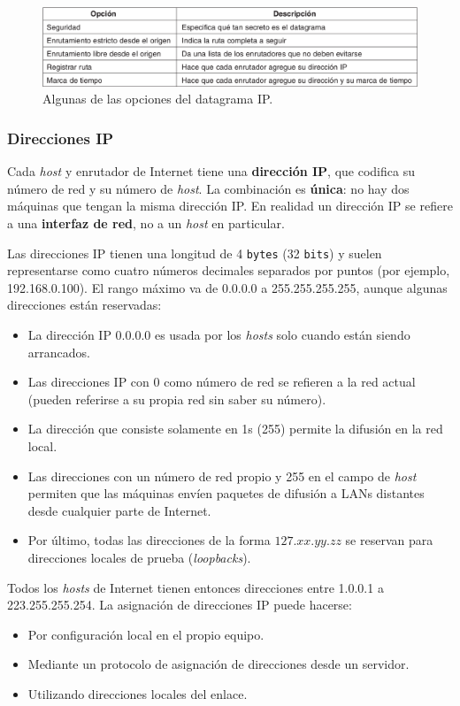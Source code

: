 \documentclass[10pt,a4paper]{article}
\begin{document}
\begin{figure}[ht!]
  \caption{Algunas de las opciones del datagrama IP.}
  \label{fig:opciones_IP}
  \centerline{\includegraphics[width=\textwidth-\fboxrule-\fboxrule]{imgs/opciones_IP.png}}
\end{figure}

\subsubsection{Direcciones IP}

Cada \textit{host} y enrutador de Internet tiene una \textbf{dirección IP}, que codifica su número de red y su número de \textit{host}. La combinación es \textbf{única}: no hay dos máquinas que tengan la misma dirección IP. En realidad un dirección IP se refiere a una \textbf{interfaz de red}, no a un \textit{host} en particular.

Las direcciones IP tienen una longitud de 4 \texttt{bytes} (32 \texttt{bits}) y suelen representarse como cuatro números decimales separados por puntos (por ejemplo, 192.168.0.100). El rango máximo va de 0.0.0.0 a 255.255.255.255, aunque algunas direcciones están reservadas:

\begin{itemize}
\item La dirección IP 0.0.0.0 es usada por los \textit{hosts} solo cuando están siendo arrancados. 
\item Las direcciones IP con 0 como número de red se refieren a la red actual (pueden referirse a su propia red sin saber su número).
\item La dirección que consiste solamente en 1s (255) permite la difusión en la red local.
\item Las direcciones con un número de red propio y 255 en el campo de \textit{host} permiten que las máquinas envíen paquetes de difusión a LANs distantes desde cualquier parte de Internet.
\item Por último, todas las direcciones de la forma $127.xx.yy.zz$ se reservan para direcciones locales de prueba (\textit{loopbacks}).
\end{itemize}

Todos los \textit{hosts} de Internet tienen entonces direcciones entre 1.0.0.1 a 223.255.255.254. La asignación de direcciones IP puede hacerse:
\begin{itemize}
\item Por configuración local en el propio equipo.
\item Mediante un protocolo de asignación de direcciones desde un servidor.
\item Utilizando direcciones locales del enlace.
\end{itemize}
\end{document}
